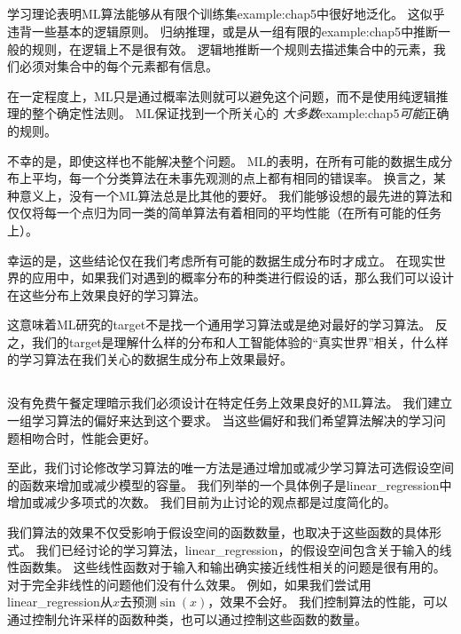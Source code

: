 \subsection{}
\label{sec:the_no_free_lunch_theorem}
学习理论表明\gls{ML}算法能够从有限个训练集\gls{example:chap5}中很好地泛化。
这似乎违背一些基本的逻辑原则。
归纳推理，或是从一组有限的\gls{example:chap5}中推断一般的规则，在逻辑上不是很有效。
逻辑地推断一个规则去描述集合中的元素，我们必须对集合中的每个元素都有信息。

在一定程度上，\gls{ML}只是通过概率法则就可以避免这个问题，而不是使用纯逻辑推理的整个确定性法则。
\gls{ML}保证找到一个所关心的 \emph{大多数}\gls{example:chap5}\emph{可能}正确的规则。

不幸的是，即使这样也不能解决整个问题。
\gls{ML}的表明，在所有可能的数据生成分布上平均，每一个分类算法在未事先观测的点上都有相同的错误率。
换言之，某种意义上，没有一个\gls{ML}算法总是比其他的要好。
我们能够设想的最先进的算法和仅仅将每一个点归为同一类的简单算法有着相同的平均性能（在所有可能的任务上）。


幸运的是，这些结论仅在我们考虑所有可能的数据生成分布时才成立。
在现实世界的应用中，如果我们对遇到的概率分布的种类进行假设的话，那么我们可以设计在这些分布上效果良好的学习算法。

这意味着\gls{ML}研究的\gls{target}不是找一个通用学习算法或是绝对最好的学习算法。
反之，我们的\gls{target}是理解什么样的分布和人工智能体验的``真实世界''相关，什么样的学习算法在我们关心的数据生成分布上效果最好。

\subsection{}
\label{sec:regularization}
没有免费午餐定理暗示我们必须设计在特定任务上效果良好的\gls{ML}算法。
我们建立一组学习算法的偏好来达到这个要求。
当这些偏好和我们希望算法解决的学习问题相吻合时，性能会更好。

至此，我们讨论修改学习算法的唯一方法是通过增加或减少学习算法可选假设空间的函数来增加或减少模型的容量。
我们列举的一个具体例子是\gls{linear_regression}中增加或减少多项式的次数。
我们目前为止讨论的观点都是过度简化的。

我们算法的效果不仅受影响于假设空间的函数数量，也取决于这些函数的具体形式。
我们已经讨论的学习算法，\gls{linear_regression}，的假设空间包含关于输入的线性函数集。
这些线性函数对于输入和输出确实接近线性相关的问题是很有用的。
对于完全非线性的问题他们没有什么效果。
例如，如果我们尝试用\gls{linear_regression}从$x$去预测$\sin(x)$，效果不会好。
我们控制算法的性能，可以通过控制允许采样的函数种类，也可以通过控制这些函数的数量。

